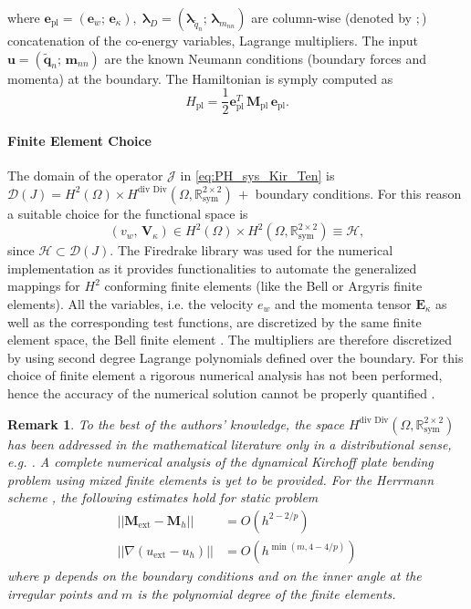 \documentclass[letterpaper, 10 pt, conference]{ieeeconf}
\newtheorem{remark}{Remark}
\begin{document}
where $\bm{e}_{\text{pl}} = (\bm{e}_w; \, \bm{e}_\kappa), \;  \bm{\lambda}_D = (\bm{\lambda}_{\widetilde{q}_n}; \, \bm{\lambda}_{m_{nn}})$ are column-wise (denoted by $;$) concatenation of the co-energy variables, Lagrange multipliers. The input $\bm{u} = (\widetilde{\bm{q}}_n; \, \bm{m}_{nn})$ are the known Neumann conditions (boundary forces and momenta) at the boundary. 
 The Hamiltonian is symply computed as
\begin{equation} \label{eq:H_discr}
H_{\text{pl}} = \frac{1}{2} \bm{e}_{\text{pl}}^T \, \bm{M}_{\text{pl}} \, \bm{e}_{\text{pl}}.
\end{equation}

\paragraph{Finite Element Choice}
\label{par:FE}
The domain of the operator $\mathcal{J}$ in \eqref{eq:PH_sys_Kir_Ten} is $\mathcal{D}(J) = H^{2}(\Omega) \times  H^{\text{div Div}}(\Omega, \mathbb{R}^{2 \times 2}_{\text{sym}}) \,+ $ boundary conditions. For this reason a suitable choice for the functional space is
\begin{equation}
(v_w, \,\bm{V}_\kappa) \in H^{2}(\Omega) \times H^{2}(\Omega, \mathbb{R}^{2 \times 2}_{\text{sym}}) \equiv \mathscr{H},
\end{equation}
since $\mathscr{H} \subset \mathcal{D}(J)$. 
The Firedrake library \cite{firedrake} was used for the numerical implementation  as it provides functionalities to automate the generalized mappings for $H^2$ conforming finite elements (like the Bell or Argyris finite elements). All the variables, i.e. the velocity $e_w$ and the momenta tensor $\bm{E}_\kappa$ as well as the corresponding test functions, are discretized by the same finite element space, the Bell finite element \cite{Bell}. The multipliers are therefore discretized by using second degree Lagrange polynomials defined over the boundary. For this choice of finite element a rigorous numerical analysis has not been performed, hence the accuracy of the numerical solution cannot be properly quantified .

\begin{remark}
	To the best of the authors' knowledge, the space $H^{\text{div Div}}(\Omega, \mathbb{R}^{2 \times 2}_{\text{sym}})$ has been addressed in the mathematical literature only in a distributional sense, e.g. \cite{mixed_kirchhoff}. A complete numerical analysis of the dynamical Kirchoff plate bending problem using mixed finite elements is yet to be provided. For the Herrmann scheme \cite{Blum1990}, the following estimates hold for static problem
	\begin{align*}
	||\bm{M}_{\text{ext}} - \bm{M}_h || &= O(h^{2 - 2/p}) \\
	||\nabla (u_{\text{ext}} - u_h) || &= O(h^{\min(m, 4-4/p)})
	\end{align*}
	where $p$ depends on the boundary conditions and on the inner angle at the irregular points and $m$ is the polynomial degree of the finite elements. 
\end{remark}
\end{document}
